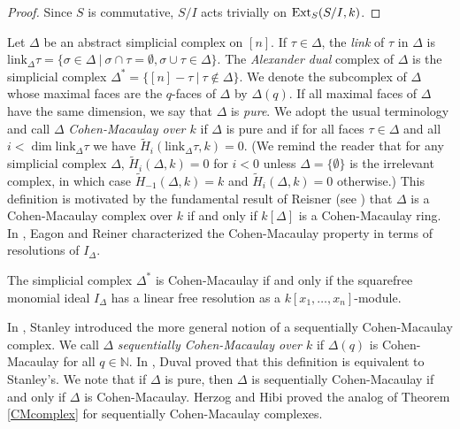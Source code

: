 \documentclass[11pt,righttag]{amsart}
\begin{document}
\begin{proof}
Since $S$ is commutative, $S/I$ acts trivially on ${\hbox{{\rm Ext}}}_S(S/I,k)$. 

\end{proof}

Let ${\Delta}$ be an abstract simplicial complex on $[n]$. If ${\tau}\in{\Delta}$, the \emph{link} of ${\tau}$ in ${\Delta}$ is ${\text{link}}_{\Delta}{\tau} =\{{\sigma}\in{\Delta}\ |\ {\sigma}\cap{\tau}=\emptyset, {\sigma}\cup{\tau}\in{\Delta}\}$. The \emph{Alexander dual} complex of ${\Delta}$ is the simplicial complex  ${\Delta}^*=\{[n]-{\tau}\ |\ {\tau}\notin{\Delta}\}$. We denote the subcomplex of ${\Delta}$ whose maximal faces are the $q$-faces of ${\Delta}$ by ${\Delta}(q)$. If all maximal faces of ${\Delta}$ have the same dimension, we say that ${\Delta}$ is \emph{pure}.
We adopt the usual terminology and call ${\Delta}$  \emph{Cohen-Macaulay over $k$} if ${\Delta}$ is pure and if for all faces ${\tau}\in{\Delta}$ and all $i<\dim {\text{link}}_{\Delta} {\tau}$ we have $\widetilde{H}_i({\text{link}}_{\Delta}{\tau}, k)=0$. (We remind the reader that for any simplicial complex ${\Delta}$, $\widetilde{H}_i({\Delta},k)=0$ for $i<0$ unless ${\Delta}=\{\emptyset\}$ is the irrelevant complex, in which case $\widetilde{H}_{-1}({\Delta},k)=k$ and $\widetilde{H}_i({\Delta},k)=0$ otherwise.) This definition is motivated by the fundamental result of Reisner (see \cite{Reis}) that ${\Delta}$ is a Cohen-Macaulay complex over $k$  if and only if $k[{\Delta}]$ is a Cohen-Macaulay ring. In \cite{ER}, Eagon and Reiner characterized the Cohen-Macaulay property in terms of resolutions of $I_{\Delta}$.

\begin{thm}[\cite{ER}]
\label{CMcomplex}
The simplicial complex ${\Delta}^*$ is Cohen-Macaulay if and only if the squarefree monomial ideal $I_{\Delta}$ has a linear free resolution as a $k[x_1,\ldots,x_n]$-module.
\end{thm}

In \cite{Stanley}, Stanley introduced the more general notion of a sequentially Cohen-Macaulay complex. We call ${\Delta}$ \emph{sequentially Cohen-Macaulay over $k$} if ${\Delta}(q)$ is Cohen-Macaulay for all $q\in{{\mathbb N}}$. 
In \cite{Duval}, Duval proved that this definition is equivalent to Stanley's.  We note that if ${\Delta}$ is pure, then ${\Delta}$ is sequentially Cohen-Macaulay if and only if ${\Delta}$ is Cohen-Macaulay. Herzog and Hibi proved the analog of Theorem \ref{CMcomplex} for sequentially Cohen-Macaulay complexes.
\end{document}
